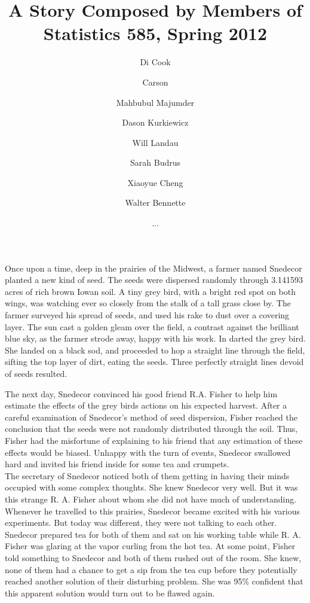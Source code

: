 \documentclass{article}
\begin{document}
\title{A Story Composed by Members of Statistics 585, Spring 2012}
\author{Di Cook \and Carson \and Mahbubul Majumder \and Dason Kurkiewicz \and Will Landau \and Sarah Budrus \and Xiaoyue Cheng \and Walter Bennette \and ...}
\maketitle

Once upon a time, deep in the prairies of the Midwest, a farmer named Snedecor planted a new kind of seed. The seeds were dispersed randomly through 3.141593 acres of rich brown Iowan soil. A tiny grey bird, with a bright red spot on both wings, was watching ever so closely from the stalk of a tall grass close by. The farmer surveyed his spread of seeds, and used his rake to dust over a covering layer. The sun cast a golden gleam over the field, a contrast against the brilliant blue sky, as the farmer strode away, happy with his work. In darted the grey bird. She landed on a black sod, and proceeded to hop a straight line through the field, sifting the top layer of dirt, eating the seeds. Three perfectly straight lines devoid of seeds resulted. 

The next day, Snedecor convinced his good friend R.A. Fisher to help him estimate the effects of the grey birds actions on his expected harvest. After a careful examination of Snedecor's method of seed dispersion, Fisher reached the conclusion that the seeds were not randomly distributed through the soil. Thus, Fisher had the misfortune of explaining to his friend that any estimation of these effects would be biased. Unhappy with the turn of events, Snedecor swallowed hard and invited his friend inside for some tea and crumpets. \\


The secretary of Snedecor noticed both of them getting in having their minds occupied with some complex thoughts. She knew Snedecor very well. But it was this strange R. A. Fisher about whom she did not have much of understanding. Whenever he travelled to this prairies, Snedecor became excited with his various experiments. But today was different, they were not talking to each other. Snedecor prepared tea for both of them and sat on his working table while R. A. Fisher was glaring at the vapor curling from the hot tea. At some point, Fisher told something to Snedecor and both of them rushed out of the room. She knew, none of them had a chance to get a sip from the tea cup before they potentially reached another solution of their disturbing problem. She was 95\% confident that this apparent solution would turn out to be flawed again. 
\end{document}
